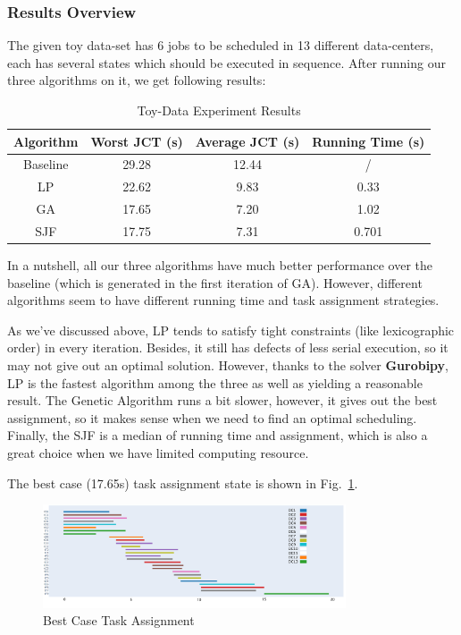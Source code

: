 \documentclass{llncs}
\begin{document}
\subsubsection{Results Overview}
The given toy data-set has 6 jobs to be scheduled in 13 different data-centers, each has several states which should be executed in sequence. After running our three algorithms on it, we get following results:
\begin{table}[htbp]
    \caption{Toy-Data Experiment Results}
    \centering
    \begin{tabular}{|c|c|c|c|}
    \hline
       {\bf Algorithm} &{\bf Worst JCT (s)} &{\bf Average JCT (s)} &{\bf Running Time (s)} \\ \hline
       Baseline &29.28 &12.44 &/ \\ \hline
       LP &22.62 &9.83 &0.33 \\ \hline
       GA &17.65 &7.20 &1.02 \\ \hline
       SJF &17.75 &7.31 &0.701 \\ \hline
    \end{tabular}
    \label{tab:toyResults}
\end{table}

In a nutshell, all our three algorithms have much better performance over the baseline (which is generated in the first iteration of GA). However, different algorithms seem to have different running time and task assignment strategies.

As we've discussed above, LP tends to satisfy tight constraints (like lexicographic order) in every iteration. Besides, it still has defects of less serial execution, so it may not give out an optimal solution. However, thanks to the solver {\bf Gurobipy}, LP is the fastest algorithm among the three as well as yielding a reasonable result. The Genetic Algorithm runs a bit slower, however, it gives out the best assignment, so it makes sense when we need to find an optimal scheduling. Finally, the SJF is a median of running time and assignment, which is also a great choice when we have limited computing resource.

The best case (17.65s) task assignment state is shown in Fig.~\ref{fig:bestAssign}.
\begin{figure}[htbp]
    \centering
    \includegraphics[width=0.8\textwidth]{Figures/gannt.png}
    \caption{Best Case Task Assignment}
    \label{fig:bestAssign}
\end{figure}
\end{document}
